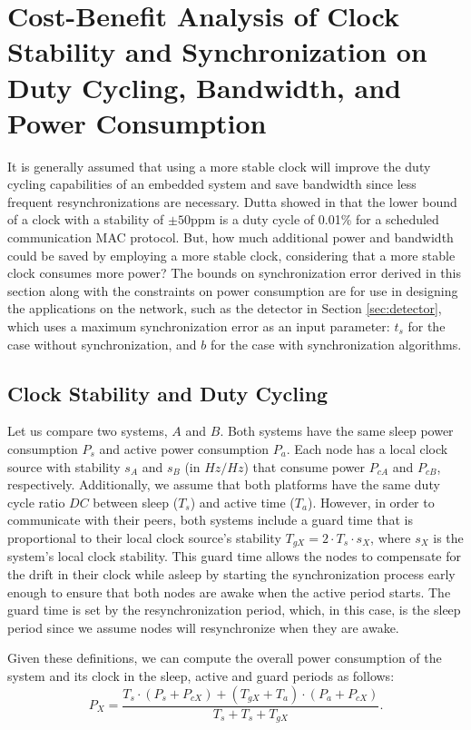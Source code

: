 \section{Cost-Benefit Analysis of Clock Stability and Synchronization 
on Duty Cycling, Bandwidth, and Power Consumption}
\label{sec:power}

It is generally assumed that using a more stable clock will improve the duty
cycling capabilities of an embedded system and save bandwidth since less 
frequent resynchronizations are necessary. Dutta
showed in \cite{dutta2007procrastination} that the lower bound of a clock with
a stability of $\pm 50$ppm is a duty cycle of 0.01\% for a scheduled
communication MAC protocol. But, how much additional power and bandwidth could be saved by
employing a more stable clock, considering that a more stable clock consumes
more power? The bounds on synchronization error derived in this section along 
with the constraints on power consumption are for use in designing the applications 
on the network, such as the detector in Section \ref{sec:detector}, which uses a maximum 
synchronization error as an input parameter: $t_s$ for the case without 
synchronization, and $b$ for the case with synchronization algorithms.


\subsection{Clock Stability and Duty Cycling}
Let us compare two systems, $A$ and $B$. Both systems have the same sleep power
consumption $P_s$ and active power consumption $P_a$.  Each node has a local
clock source with stability $s_A$ and $s_B$ (in $Hz/Hz$) that consume power $P_{cA}$ and $P_{cB}$,
respectively. Additionally, we assume that both platforms have the same duty
cycle ratio $DC$ between sleep ($T_s$) and active time ($T_a$). However, in order
to communicate with their peers, both systems include a guard time that is
proportional to their local clock source's stability $T_{gX} = 2 \cdot T_s \cdot
s_X$, where $s_X$ is the system's local clock stability. This guard time
allows the nodes to compensate for the drift in their clock while asleep by starting 
the synchronization process early enough to ensure that both nodes are awake when 
the active period starts. The guard time is set by the resynchronization period, which,
 in this case, is the sleep period since we assume nodes will resynchronize when 
they are awake.

Given these definitions, we can compute the overall power consumption of the
system and its clock in the sleep, active and guard periods as follows:
\begin{equation}
	P_X = \frac{T_s \cdot (P_s + P_{cX}) + (T_{gX} + T_a) \cdot (P_a + P_{cX})}{T_s + T_s + T_{gX}}.
\end{equation}

